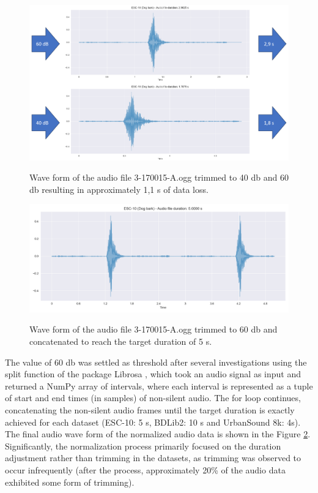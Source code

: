 \begin{figure}[htbp]
    \raggedright
        \caption{Wave form of the audio file 3-170015-A.ogg trimmed to 40 \gls{db} and 60 \gls{db} resulting in approximately 1,1 \gls{s} of data loss.}
        \includegraphics[width=1\textwidth]{resources/images/050-methods/Methods_normalization_comparison_40db_60db.png}
        \label{fig:methods_normalization_40_db_x_60_db_wave_form}
\end{figure}


\begin{figure}[htbp]
    \raggedright
        \caption{Wave form of the audio file 3-170015-A.ogg trimmed to 60 \gls{db} and concatenated to reach the target duration of 5 \gls{s}.}
        \includegraphics[width=1\textwidth]{resources/images/050-methods/Methods_normalization_normalized.png}
        \label{fig:methods_normalization_normalized_audio_data}
\end{figure}

The value of 60 \gls{db} was settled as threshold after several investigations using the split function of the package Librosa \cite{McFee2015librosa_sw}, which took an audio signal as input and returned a NumPy array of intervals, where each interval is represented as a tuple of start and end times (in samples) of non-silent audio. The for loop continues, concatenating the non-silent audio frames until the target duration is exactly achieved for each dataset (ESC-10: 5 \gls{s}, BDLib2: 10 \gls{s} and UrbanSound 8k: 4s). The final audio wave form of the normalized audio data is shown in the Figure \ref{fig:methods_normalization_normalized_audio_data}. Significantly, the normalization process primarily focused on the duration adjustment rather than trimming in the datasets, as trimming was observed to occur infrequently (after the process, approximately 20\% of the audio data exhibited some form of trimming).


